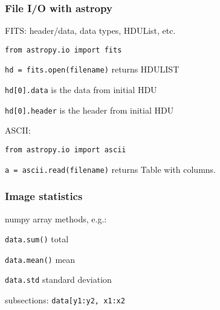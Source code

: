 \documentclass{article}
\begin{document}
\subsubsection*{File I/O with astropy}
\begin{itemize*}
    \item FITS: header/data, data types, HDUList, etc.
        \begin{itemize*}
            \item \verb|from astropy.io import fits|
            \item \verb|hd = fits.open(filename)| returns HDULIST
            \item \verb|hd[0].data| is the data from initial HDU
            \item \verb|hd[0].header| is the header from initial HDU
        \end{itemize*}
    \item ASCII:
        \begin{itemize*}
            \item \verb|from astropy.io import ascii|
            \item \verb|a = ascii.read(filename)| returns Table with
                columns.
        \end{itemize*}
\end{itemize*}
\subsubsection*{Image statistics}
\begin{itemize*}
    \item numpy array methods, e.g.:
        \begin{itemize*}
            \item \verb|data.sum()| total
            \item \verb|data.mean()| mean
            \item \verb|data.std| standard deviation
        \end{itemize*}
    \item subsections: \verb|data[y1:y2, x1:x2|
\end{itemize*}
\end{document}
